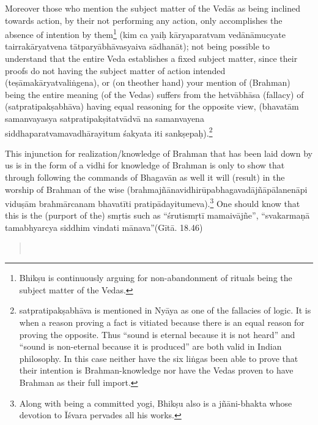 Moreover those who mention the subject matter of the Vedās as being inclined towards action,  by their not performing any action, only accomplishes the absence of intention by them\footnote{Bhikṣu is continuously arguing for non-abandonment of rituals being the subject matter of the Vedas.} (kim ca yaiḥ kāryaparatvam vedānāmucyate tairrakāryatvena tātparyābhāvasyaiva sādhanāt); not being possible to understand that the entire Veda establishes a fixed subject matter, since their proofs do not having the subject matter of action intended (teṣāmakāryatvaliṅgena),  or (on the\break other hand) your mention of (Brahman) being the entire meaning (of the Vedas) suffers from the hetvābhāsa (fallacy) of (satpratipakṣabhāva) having equal reasoning for the opposite view,  (bhavatām samanvayasya satpratipakṣitatvādvā na samanvayena siddhaparatvamavadhārayitum śakyata iti sankṣepaḥ).\footnote{satpratipakṣabhāva is mentioned in Nyāya as one of the fallacies of logic. It is when a reason proving a fact is vitiated because there is an equal reason for proving the opposite. Thus “sound is eternal because it is not heard” and “sound is non-eternal because it is produced” are both valid in Indian philosophy. In this case neither have the six liṅgas been able to prove that their intention is Brahman-knowledge nor have the Vedas proven to have Brahman as their full import.} 

This injunction for realization/knowledge of Brahman that has been laid down by us is in the form of a vidhi for knowledge of Brahman is only to show that through following the commands of Bhagavān as well it will (result) in the worship of Brahman of the wise (brahmajñānavidhirūpabhagavadājñāpālanenāpi viduṣām brahmārcanam bhava\-tīti pratipādayitumeva).\footnote{Along with being a committed yogi, Bhikṣu also is a jñāni-bhakta whose devotion to Īśvara pervades all his works.} One should know that this is the (purport of the) smṛtis such as “śrutismṛtī mamaivājñe”, “svakarmaṇā tamabhyarcya siddhim vindati mānava”(Gītā. 18.46)

\begin{verse}
\\
\end{verse}

